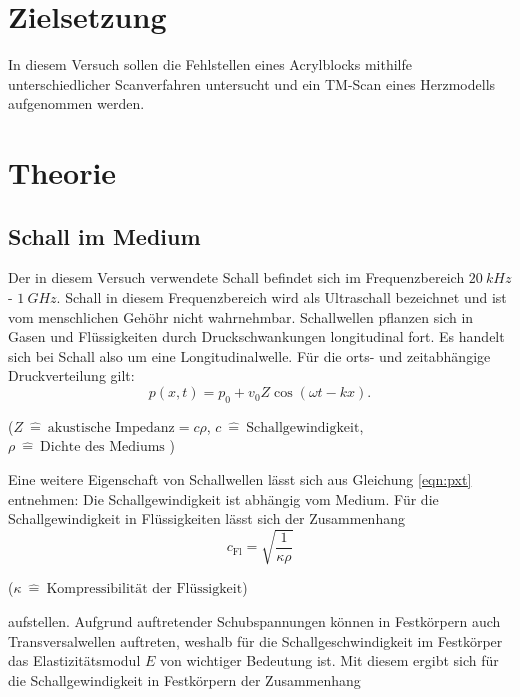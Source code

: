 \section{Zielsetzung}
\label{sec:Zielsetzung}

In diesem Versuch sollen die Fehlstellen eines Acrylblocks mithilfe unterschiedlicher Scanverfahren untersucht und ein TM-Scan eines
Herzmodells aufgenommen werden.

\section{Theorie}
\label{sec:Theorie}

\subsection{Schall im Medium} \label{sec:SIM}
Der in diesem Versuch verwendete Schall befindet sich im Frequenzbereich $\SI{20}{kHz}$ - $\SI{1}{GHz}$.
Schall in diesem Frequenzbereich wird als Ultraschall bezeichnet und ist vom menschlichen Gehöhr nicht wahrnehmbar. \newline
Schallwellen pflanzen sich in Gasen und Flüssigkeiten durch Druckschwankungen longitudinal fort. Es handelt sich bei Schall also um eine Longitudinalwelle. Für
die orts- und zeitabhängige Druckverteilung gilt:
\begin{equation}
  p(x,t)=p_0+v_0 Z \cos(\omega t - kx) \text{.} \label{eqn:pxt}
\end{equation}
\begin{center}
 \tiny {($Z\: \hat{=} \:\text{akustische Impedanz}=c\rho $, $c\: \hat{=} \: \text{Schallgewindigkeit}$, $\rho\: \hat{=} \: \text{Dichte des Mediums}$ )}
\end{center}
Eine weitere Eigenschaft von Schallwellen lässt sich aus Gleichung \eqref{eqn:pxt} entnehmen: Die Schallgewindigkeit ist abhängig vom Medium.
Für die Schallgewindigkeit in Flüssigkeiten lässt sich der Zusammenhang
\begin{equation}
c_\text{{Fl}}=\sqrt{\frac{1}{\kappa\rho}}\label{eq:Fl}
\end{equation}
\begin{center}
 \tiny {($\kappa \: \hat{=} \:\text{Kompressibilität der Flüssigkeit}$)}
\end{center}
aufstellen.
Aufgrund auftretender Schubspannungen können in Festkörpern auch Transversalwellen auftreten, weshalb für die Schallgeschwindigkeit im Festkörper das Elastizitätsmodul $E$ von wichtiger Bedeutung ist.
Mit diesem ergibt sich für die Schallgewindigkeit in Festkörpern der Zusammenhang
